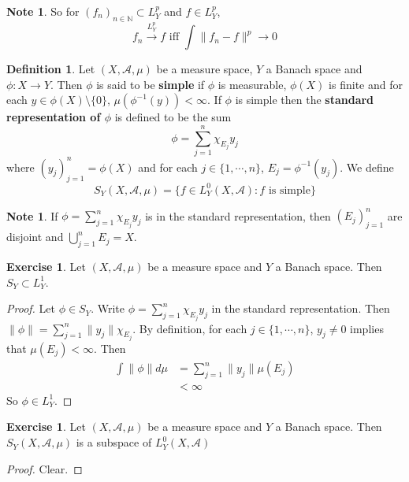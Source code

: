 \documentclass[12pt]{amsart}
\theoremstyle{definition}
\newtheorem{defn}[definition]{Definition}
\newtheorem{note}[definition]{Note}
\newtheorem{ex}[definition]{Exercise}
\newcommand{\N}{\mathbb{N}}
\newcommand{\MA}{\mathcal{A}}
\newcommand{\conv}[1]{\xrightarrow{#1}}
\newcommand{\lex}[1]{\label{ex:#1}}
\newcommand{\ld}[1]{\label{defn:#1}}
\begin{document}
	\begin{note}
	So for $(f_n)_{n \in \N} \subset L^p_Y$ and $f \in L^p_Y$, $$f_n \conv{L^p_Y} f \text{ iff } \int \|f_n - f\|^p \rightarrow 0$$ 
	\end{note}
	
	\begin{defn} \ld{00000} 
	Let $(X, \MA, \mu)$ be a measure space, $Y$ a Banach space and $\phi: X \rightarrow Y$. Then $\phi$ is said to be \textbf{simple} if $\phi$ is measurable, $\phi(X)$ is finite and for each $y \in \phi(X) \setminus \{0\}$, $\mu(\phi^{-1}(y)) < \infty$. If $\phi$ is simple then the \textbf{standard representation of $\phi$} is defined to be the sum $$\phi = \sum\limits_{j=1}^n \chi_{E_j}y_j$$ where $(y_j)_{j=1}^n = \phi(X)$ and for each $j \in \{1, \cdots, n\}$, $E_j = \phi^{-1}(y_j)$. We define $$S_Y(X, \MA, \mu) = \{f \in L_Y^0(X, \MA): f \text{ is simple}\}$$
	\end{defn}
	
	\begin{note}
	If $\phi = \sum\limits_{j=1}^n \chi_{E_j}y_j$ is in the standard representation, then $(E_j)_{j=1}^n$ are disjoint and $\bigcup\limits_{j=1}^n E_j = X$.
	\end{note}
	
	\begin{ex}
	Let $(X, \MA, \mu)$ be a measure space and $Y$ a Banach space. Then $S_Y \subset L^1_Y$. 
	\end{ex}
	
	\begin{proof}
	Let $\phi \in S_Y$. Write $\phi = \sum\limits_{j=1}^n \chi_{E_j}y_j$ in the standard representation. Then $\|\phi\| = \sum\limits_{j=1}^n \|y_j\|\chi_{E_j}$. By definition, for each $j \in \{1, \cdots, n\}$, $y_j \neq 0$ implies that $\mu(E_j) < \infty$. Then 
	\begin{align*}
	\int \|\phi\| d\mu 
	&= \sum\limits_{j=1}^n \|y_j\| \mu(E_j) \\
	&< \infty
	\end{align*}
	So $\phi \in L^1_Y$.
	\end{proof}
	
	\begin{ex} \lex{00000} 
	Let $(X, \MA, \mu)$ be a measure space and $Y$ a Banach space. Then $S_Y(X, \MA, \mu)$ is a subspace of $L_Y^0(X, \MA)$
	\end{ex}
	
	\begin{proof}
	Clear.
	\end{proof}
	
\end{document}

